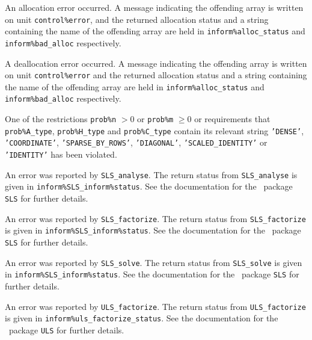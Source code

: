 \documentclass{galahad}
\begin{document}
\begin{description}

 An allocation error occurred.
A message indicating the offending
array is written on unit {\tt control\%error}, and the returned allocation
status and a string containing the name of the offending array
are held in {\tt inform\%alloc\_\-status}
and {\tt inform\%bad\_alloc} respectively.

 A deallocation error occurred.
A message indicating the offending
array is written on unit {\tt control\%error} and the returned allocation
status and a string containing the name of the offending array
are held in {\tt inform\%alloc\_\-status}
and {\tt inform\%bad\_alloc} respectively.

 One of the restrictions
   {\tt prob\%n} $> 0$ or {\tt prob\%m} $\geq  0$
    or requirements that {\tt prob\%A\_type}, {\tt prob\%H\_type} and
    {\tt prob\%C\_type} contain its relevant string
    {\tt 'DENSE'}, {\tt 'COORDINATE'}, {\tt 'SPARSE\_BY\_ROWS'},
    {\tt 'DIAGONAL'}, {\tt 'SCALED\_IDENTITY'} or {\tt 'IDENTITY'}
    has been violated.


 An error was reported by {\tt SLS\_analyse}. The return
status from {\tt SLS\_analyse} is given in
{\tt inform\%SLS\_inform\%status}.
See the documentation for the \galahad\ package {\tt SLS} for further details.

 An error was reported by {\tt SLS\_factorize}.
The return status from {\tt SLS\_factorize} is given in
{\tt inform\%SLS\_inform\%status}.
See the documentation for the \galahad\ package {\tt SLS} for further details.

 An error was reported by {\tt SLS\_solve}. The return
status from {\tt SLS\_solve} is given in {\tt inform\%SLS\_inform\%status}.
See the documentation for the \galahad\ package {\tt SLS} for further details.

 An error was reported by {\tt ULS\_factorize}.
The return status from {\tt ULS\_factorize} is given in
{\tt inform\%uls\_factorize\_\-status}.
See the documentation for the \galahad\ package {\tt ULS} for further details.


\end{description}
\end{document}
